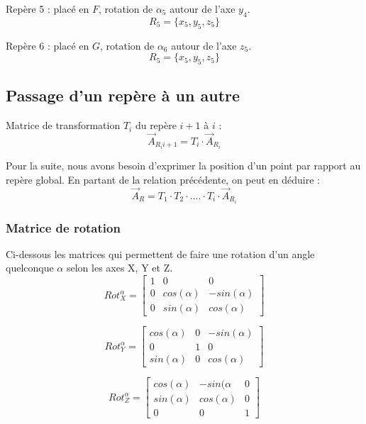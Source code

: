\documentclass[12pt,a4paper]{article}
\begin{document}
\medbreak
Repère 5 : placé en $F$, rotation de $\alpha_5$ autour de l'axe $y_4$.
\begin{equation}
R_5=\{x_5,y_5,z_5\}
\end{equation}

\medbreak
Repère 6 : placé en $G$, rotation de $\alpha_6$ autour de l'axe $z_5$.
\begin{equation}
R_5=\{x_5,y_5,z_5\}
\end{equation}

\subsection{Passage d'un repère à un autre}
Matrice de transformation $T_i$ du repère $i+1$ à $i$ : 
\begin{equation}
\vec{A}_{R_i{i+1}}=T_i \cdot \vec{A}_{R_i}
\end{equation}

Pour la suite, nous avons besoin d'exprimer la position d'un point par rapport au repère global. En partant de la relation précédente, on peut en déduire : 
\begin{equation}
\vec{A}_R=T_1 \cdot T_2 \cdot .... \cdot T_i \cdot \vec{A}_{R_i}
\end{equation}

\subsubsection{Matrice de rotation}
Ci-dessous les matrices qui permettent de faire une rotation d'un angle quelconque $\alpha$ selon les axes X, Y et Z. 
\begin{equation}
Rot_X^{\alpha}=
\begin{bmatrix}
1 & 0 & 0\\
0 & cos(\alpha) & -sin(\alpha)\\
0 & sin(\alpha) & cos(\alpha)
\end{bmatrix}
\end{equation}

\begin{equation}
Rot_Y^{\alpha}=
\begin{bmatrix}
cos(\alpha) & 0 & -sin(\alpha)\\
0 & 1 & 0\\
sin(\alpha) & 0 & cos(\alpha)
\end{bmatrix}
\end{equation}

\begin{equation}
Rot_Z^{\alpha}=
\begin{bmatrix}
cos(\alpha) & -sin(\alpha & 0\\
sin(\alpha) & cos(\alpha) & 0\\
0 & 0 & 1
\end{bmatrix}
\end{equation}
\newpage
\end{document}

